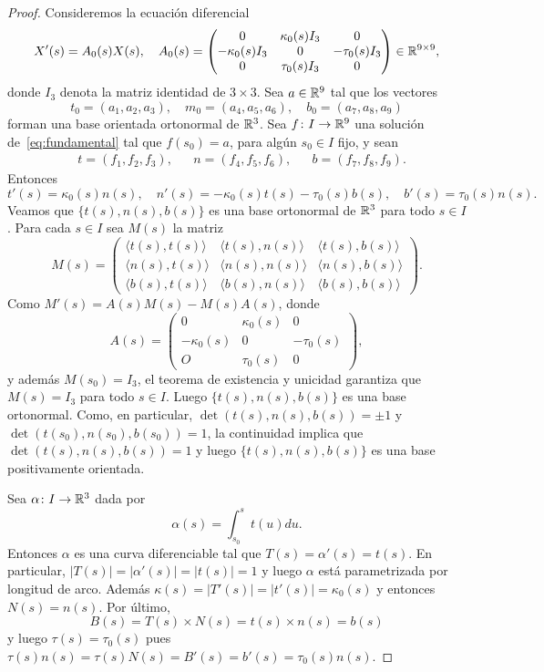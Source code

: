 \begin{proof}
	Consideremos la ecuación diferencial 
	\begin{equation}
		\label{eq:fundamental}
		X'(s)=A_0(s)X(s),\quad
		A_0(s)=\begin{pmatrix}
		0 & \kappa_0(s)I_3 & 0\\
		-\kappa_0(s)I_3 & 0 & -\tau_0(s)I_3\\
		0 & \tau_0(s)I_3 & 0
	\end{pmatrix}\in\mathbb{R}^{9\times 9},
\end{equation}
	donde $I_3$ denota la matriz identidad de $3\times 3$. 
	Sea $a\in\mathbb{R}^9$ tal que los vectores
	\[
		t_0=(a_1,a_2,a_3),\quad
		m_0=(a_4,a_5,a_6),\quad
		b_0=(a_7,a_8,a_9)
	\]
	forman una base orientada ortonormal de $\mathbb{R}^3$. Sea $f\colon I\to\mathbb{R}^9$ una
	solución de~\eqref{eq:fundamental} tal que $f(s_0)=a$, para algún $s_0\in I$
	fijo, y sean 
	\begin{align*}
		&t=(f_1,f_2,f_3), 
		&&n=(f_4,f_5,f_6),
		&&b=(f_7,f_8,f_9).
	\end{align*}
	Entonces
	\[
		t'(s)=\kappa_0(s)n(s),\quad
		n'(s)=-\kappa_0(s)t(s)-\tau_0(s)b(s),\quad
		b'(s)=\tau_0(s)n(s).
	\]
	Veamos que $\{t(s),n(s),b(s)\}$ es una base ortonormal de $\mathbb{R}^3$ para todo
	$s\in I$. Para cada $s\in I$ sea $M(s)$ la matriz 
	\[
		M(s)=\begin{pmatrix}
			\langle t(s),t(s)\rangle & \langle t(s),n(s)\rangle & \langle t(s),b(s)\rangle\\
			\langle n(s),t(s)\rangle & \langle n(s),n(s)\rangle & \langle n(s),b(s)\rangle\\
			\langle b(s),t(s)\rangle & \langle b(s),n(s)\rangle & \langle b(s),b(s)\rangle
		\end{pmatrix}.
	\]
	Como $M'(s)=A(s)M(s)-M(s)A(s)$, donde
	\[
		A(s)=\begin{pmatrix}
		0 & \kappa_0(s) & 0\\
		-\kappa_0(s) & 0 & -\tau_0(s)\\
		O & \tau_0(s) & 0
	\end{pmatrix},
	\]
	y además $M(s_0)=I_3$, el teorema de existencia y unicidad garantiza que
	$M(s)=I_3$ para todo $s\in I$. Luego $\{t(s),n(s),b(s)\}$ es una base
	ortonormal. Como, en particular, $\det(t(s),n(s),b(s))=\pm 1$ y
	$\det(t(s_0),n(s_0),b(s_0))=1$, la continuidad implica que
	$\det(t(s),n(s),b(s))=1$  y luego $\{t(s),n(s),b(s)\}$ es una base
	positivamente orientada.

	Sea $\alpha\colon I\to\mathbb{R}^3$ dada por 
	\[
		\alpha(s)=\int_{s_0}^st(u)du.
	\]
	Entonces $\alpha$ es una curva diferenciable tal que $T(s)=\alpha'(s)=t(s)$. En particular,
	$|T(s)|=|\alpha'(s)|=|t(s)|=1$ y luego $\alpha$ está parametrizada
	por longitud de arco. Además
	$\kappa(s)=|T'(s)|=|t'(s)|=\kappa_0(s)$ y 
	entonces $N(s)=n(s)$. Por último, 
	\[
		B(s)=T(s)\times N(s)=t(s)\times n(s)=b(s)
	\]
	y luego $\tau(s)=\tau_0(s)$ pues
	$\tau(s)n(s)=\tau(s)N(s)=B'(s)=b'(s)=\tau_0(s)n(s)$.
\end{proof}


